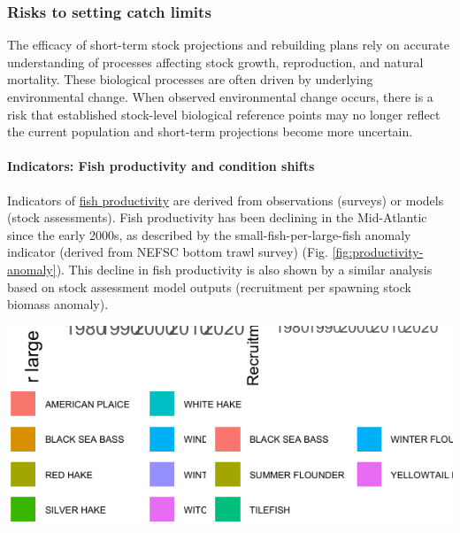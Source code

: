 \documentclass[
  10pt,
]{article}
\let\origfigure\figure
\let\endorigfigure\endfigure
\renewenvironment{figure}[1][2] {
    \expandafter\origfigure\expandafter[H]
} {
    \endorigfigure
}
\begin{document}
\subsubsection{Risks to setting catch limits}\label{risks-to-setting-catch-limits}

The efficacy of short-term stock projections and rebuilding plans rely on accurate understanding of processes affecting stock growth, reproduction, and natural mortality. These biological processes are often driven by underlying environmental change. When observed environmental change occurs, there is a risk that established stock-level biological reference points may no longer reflect the current population and short-term projections become more uncertain.

\paragraph{Indicators: Fish productivity and condition shifts}\label{indicators-fish-productivity-and-condition-shifts}

Indicators of \href{https://noaa-edab.github.io/catalog/productivity_anomaly.html}{fish productivity} are derived from observations (surveys) or models (stock assessments). Fish productivity has been declining in the Mid-Atlantic since the early 2000s, as described by the small-fish-per-large-fish anomaly indicator (derived from NEFSC bottom trawl survey) (Fig. \ref{fig:productivity-anomaly}). This decline in fish productivity is also shown by a similar analysis based on stock assessment model outputs (recruitment per spawning stock biomass anomaly).

\begin{figure}

{\centering \includegraphics{midatlantic_files/figure-latex/productivity-anomaly-1} 

}

\caption{Fish productivity measures. Left: Small fish per large fish survey biomass anomaly in the Mid-Atlantic Bight. Right: assessment recruitment per spawning stock biomass anomaly for stocks mainly in the Mid-Atlantic. The summed anomaly across species is shown by the black line, drawn across all years with the same number of stocks analyzed.}\label{fig:productivity-anomaly}
\end{figure}
\end{document}
